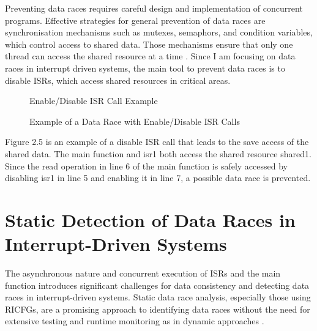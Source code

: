 \documentclass[
fancyheadings, %
%
%
]{stsreprt}
\begin{document}
{Preventing data races requires careful design and implementation of concurrent programs. Effective strategies for general prevention of data races are synchronisation mechanisms such as mutexes, semaphors, and condition variables, which control access to shared data. Those mechanisms ensure that only one thread can access the shared resource at a time \cite{herlihy2008}. Since I am focusing on data races in interrupt driven systems, the main tool to prevent data races is to disable ISRs, which access shared resources in critical areas.
\begin{figure}[H]
	\centering
	\begin{algorithm}[H]
		\caption{Enable/Disable ISR Call Example}
		
		
		
		
	\end{algorithm}
	\caption{Example of a Data Race with Enable/Disable ISR Calls}
\end{figure}
Figure 2.5 is an example of a disable ISR call that leads to the save access of the shared data. The main function and isr1 both access the shared resource shared1. Since the read operation in line 6 of the main function is safely accessed by disabling isr1 in line 5 and enabling it in line 7, a possible data race is prevented.
\section{Static Detection of Data Races in Interrupt-Driven Systems}

The asynchronous nature and concurrent execution of ISRs and the main function introduces significant challenges for data consistency and detecting data races in interrupt-driven systems. Static data race analysis, especially those using RICFGs, are a promising approach to identifying data races without the need for extensive testing and runtime monitoring as in dynamic approaches \cite{wang2020}.

}
\end{document}
